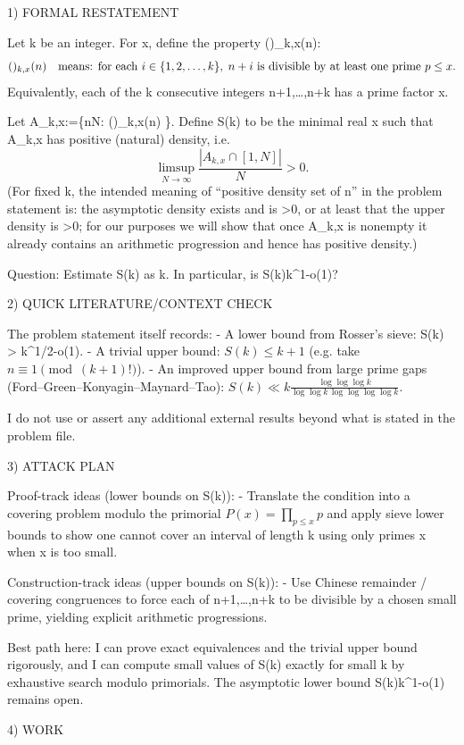 
1) FORMAL RESTATEMENT

Let k be an integer.
For x, define the property (\*)_{k,x}(n):
\[(\*)_{k,x}(n)\quad\text{means: for each } i\in\{1,2,\dots,k\},\; n+i \text{ is divisible by at least one prime } p\le x.\]
Equivalently, each of the k consecutive integers n+1,\dots,n+k has a prime factor \le x.

Let A_{k,x}:=\{n\in\mathbb N: (\*)_{k,x}(n) \}.
Define S(k) to be the minimal real x such that A_{k,x} has positive (natural) density, i.e.
\[ \limsup_{N\to\infty} \frac{|A_{k,x}\cap[1,N]|}{N} > 0. \]
(For fixed k, the intended meaning of “positive density set of n” in the problem statement is: the asymptotic density exists and is >0, or at least that the upper density is >0; for our purposes we will show that once A_{k,x} is nonempty it already contains an arithmetic progression and hence has positive density.)

Question: Estimate S(k) as k\to\infty. In particular, is S(k)\ge k^{1-o(1)}?


2) QUICK LITERATURE/CONTEXT CHECK

The problem statement itself records:
- A lower bound from Rosser’s sieve: S(k) > k^{1/2-o(1)}.
- A trivial upper bound: \(S(k)\le k+1\) (e.g. take \(n\equiv 1 \pmod{(k+1)!}\)).
- An improved upper bound from large prime gaps (Ford–Green–Konyagin–Maynard–Tao):
  \(S(k) \ll k \frac{\log\log\log k}{\log\log k\,\log\log\log\log k}.\)

I do not use or assert any additional external results beyond what is stated in the problem file.


3) ATTACK PLAN

Proof-track ideas (lower bounds on S(k)):
- Translate the condition into a covering problem modulo the primorial \(P(x)=\prod_{p\le x} p\) and apply sieve lower bounds to show one cannot cover an interval of length k using only primes \le x when x is too small.

Construction-track ideas (upper bounds on S(k)):
- Use Chinese remainder / covering congruences to force each of n+1,\dots,n+k to be divisible by a chosen small prime, yielding explicit arithmetic progressions.

Best path here: I can prove exact equivalences and the trivial upper bound rigorously, and I can compute small values of S(k) exactly for small k by exhaustive search modulo primorials. The asymptotic lower bound S(k)\ge k^{1-o(1)} remains open.


4) WORK

